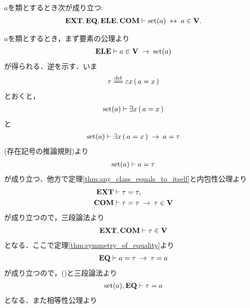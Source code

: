 	\begin{screen}
		\begin{thm}
		\label{thm:V_is_the_whole_of_sets}
			$a$を類とするとき次が成り立つ:
			\begin{align}
				\mbox{{\bf EXT}},\mbox{{\bf EQ}},\mbox{{\bf ELE}},\mbox{\bf COM} \vdash \operatorname*{set} (a) \hspace{0.25em}\leftrightarrow\hspace{0.25em} a \in \mathbf{V}.
			\end{align}
		\end{thm}
	\end{screen}
	
	\begin{prf}
		$a$を類とするとき，まず要素の公理より
		\begin{align}
			\mbox{{\bf ELE}} \vdash a \in \mathbf{V} \hspace{0.25em}\rightarrow\hspace{0.25em} \operatorname*{set} (a)
		\end{align}
		が得られる．逆を示す．いま
		\begin{align}
			\tau \defeq \varepsilon x\, (\, a = x\, )
		\end{align}
		とおくと，
		\begin{align}
			\operatorname*{set} (a) \vdash \exists x\, (\, a = x\, )
		\end{align}
		と
		\begin{align}
			\operatorname*{set} (a) \vdash \exists x\, (\, a = x\, ) \hspace{0.25em}\rightarrow\hspace{0.25em} a = \tau
		\end{align}
		(存在記号の推論規則)より
		\begin{align}
			\operatorname*{set} (a) \vdash a = \tau
			\label{fom:thm_V_is_the_whole_of_sets_1}
		\end{align}
		が成り立つ．他方で定理\ref{thm:any_class_equals_to_itself}と内包性公理より
		\begin{align}
			\mbox{{\bf EXT}} &\vdash \tau = \tau, \\
			\mbox{\bf COM} &\vdash \tau = \tau \hspace{0.25em}\rightarrow\hspace{0.25em} \tau \in \mathbf{V}
		\end{align}
		が成り立つので，三段論法より
		\begin{align}
			\mbox{{\bf EXT}},\mbox{\bf COM} \vdash \tau \in \mathbf{V}
			\label{fom:thm_V_is_the_whole_of_sets_2}
		\end{align}
		となる．ここで定理\ref{thm:symmetry_of_equality}より
		\begin{align}
			\mbox{{\bf EQ}} \vdash a = \tau \hspace{0.25em}\rightarrow\hspace{0.25em} \tau = a
		\end{align}
		が成り立つので，()と三段論法より
		\begin{align}
			\operatorname*{set} (a),\mbox{{\bf EQ}} \vdash \tau = a
			\label{fom:thm_V_is_the_whole_of_sets_3}
		\end{align}
		となる．また相等性公理より
		\begin{align}

\end{align}
\end{prf}
